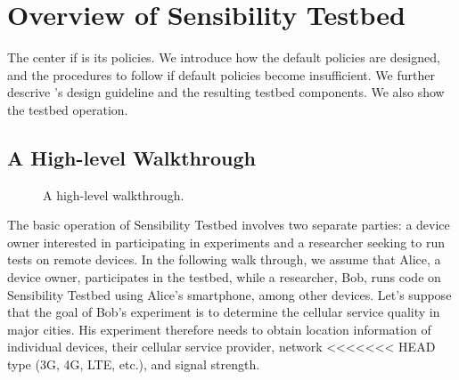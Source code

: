 \section{Overview of Sensibility Testbed}\label{sec-overview}
The center if \sysname is its policies. We introduce how the default
policies are designed, and the procedures to follow if default policies
become insufficient. We further descrive \sysname's design guideline 
and the resulting testbed components. We also show the testbed operation.

\subsection{A High-level Walkthrough}\label{sec-walkthrough}

\begin{figure}
\caption{\small A high-level walkthrough. \label{fig-walkthrough}}
\end{figure}

The basic operation of Sensibility Testbed involves two separate 
parties: a device owner interested in participating in experiments 
and a researcher seeking to run tests on remote devices. In the 
following walk through, we assume that Alice, a device owner, participates in 
the testbed, while a researcher, Bob, runs code on Sensibility Testbed 
using Alice's smartphone, among other
devices. Let's suppose that the goal of Bob's experiment is to determine the cellular service
quality in major cities. His experiment therefore needs to obtain location information
of individual devices, their cellular service provider, network
<<<<<<< HEAD
type (3G, 4G, LTE, etc.), and signal strength. 

